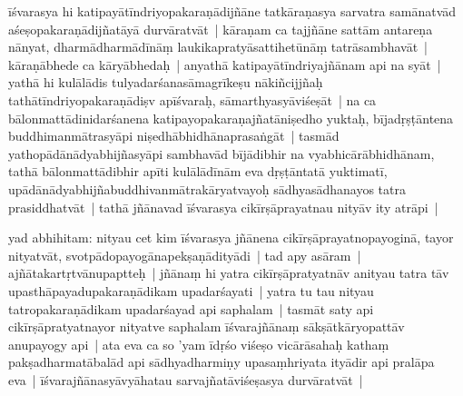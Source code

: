 \documentclass[article,12pt,a4paper]{memoir}%
\newcounter{parCount}
\begin{document}
	  \pstart \leavevmode%
	\label{thakur75-35.3}īśvarasya hi katipayātīndriyopakaraṇādijñāne tatkāraṇasya sarvatra samānatvād aśeṣopakaraṇādijñatāyā durvāratvāt | kāraṇam ca tajjñāne sattām antareṇa nānyat, dharmādharmādīnāṃ laukikapratyāsattihetūnāṃ tatrāsambhavāt | kāraṇābhede ca kāryābhedaḥ | anyathā katipayātīndriyajñānam api na syāt | yathā hi \label{ratnakīrtinibandhāvali__36r1PF7IMWUFC5S10GC5G797R9K}kulālādis\label{ratnakīrtinibandhāvali__36r1PF7IMWTROD9VEEQNOUKG7MN} tulyadarśanasāmagrīkeṣu nākiñcij\label{ratnakīrtinibandhāvali__36r1PF7IMWT51K8YNUUTZQTQ86H}jñaḥ\label{ratnakīrtinibandhāvali__36r1PF7IMWSHSBW8CCLYGRITU90} tathātīndriyopakaraṇādiṣv apīśvaraḥ, sāmarthyasyāviśeṣāt | na ca bālonmattādinidarśanena katipayopakaraṇajñatāniṣedho yuktaḥ, bījadṛṣṭāntena buddhimanmātrasyāpi niṣedhābhidhānaprasaṅgāt | tasmād yathopādānādyabhijñasyāpi sambhavād bījādibhir na vyabhicārābhidhānam, tathā bālonmattādibhir apīti kulālādīnām eva dṛṣṭāntatā yuktimatī, upādānādyabhijñabuddhivanmātrakāryatvayoḥ sādhyasādhanayos tatra prasiddhatvāt | tathā jñānavad īśvarasya cikīrṣāprayatnau nityāv ity atrāpi |
	{}
	\pend%
      

	  \pstart \leavevmode%
	\label{thakur75-35.14}yad abhihitam: nityau cet kim īśvarasya jñānena cikīrṣāprayatnopayoginā, tayor nityatvāt, svotpādopayogānapekṣaṇādityādi | tad apy asāram | ajñātakartṛtvānupaptteḥ | jñānaṃ hi yatra cikīrṣāpratyatnāv anityau tatra tāv upasthāpayadupakaraṇādikam upadarśayati | yatra tu tau nityau tatropakaraṇādikam upadarśayad api saphalam | tasmāt saty api cikīrṣāpratyatnayor nityatve saphalam īśvarajñānaṃ sākṣātkāryopattāv anupayogy api | ata eva ca so 'yam īdṛśo viśeṣo vicārāsahaḥ kathaṃ pakṣadharmatābalād api sādhyadharmiṇy upasaṃhriyata ityādir api pralāpa eva | īśvarajñānasyāvyāhatau sarvajñatāviśeṣasya durvāratvāt |
	{}
	\pend%
      
\end{document}
